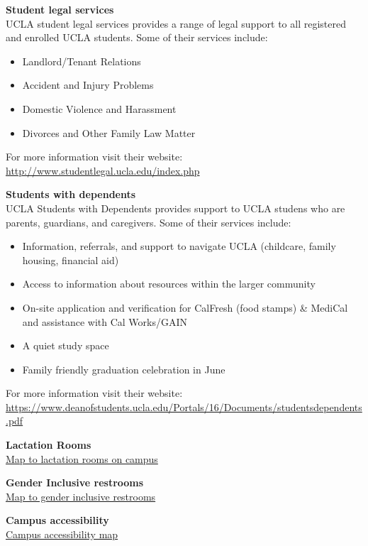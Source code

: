 \documentclass[11pt,]{article}
\providecommand{\tightlist}{%
  \setlength{\itemsep}{0pt}\setlength{\parskip}{0pt}}
\begin{document}
\textbf{Student legal services}\\
UCLA student legal services provides a range of legal support to all
registered and enrolled UCLA students. Some of their services include:

\begin{itemize}
\tightlist
\item
  Landlord/Tenant Relations\\
\item
  Accident and Injury Problems\\
\item
  Domestic Violence and Harassment\\
\item
  Divorces and Other Family Law Matter
\end{itemize}

For more information visit their website:
\url{http://www.studentlegal.ucla.edu/index.php}

\textbf{Students with dependents}\\
UCLA Students with Dependents provides support to UCLA studens who are
parents, guardians, and caregivers. Some of their services include:

\begin{itemize}
\tightlist
\item
  Information, referrals, and support to navigate UCLA (childcare,
  family housing, financial aid)\\
\item
  Access to information about resources within the larger community\\
\item
  On-site application and verification for CalFresh (food stamps) \&
  MediCal and assistance with Cal Works/GAIN\\
\item
  A quiet study space\\
\item
  Family friendly graduation celebration in June
\end{itemize}

For more information visit their website:
\url{https://www.deanofstudents.ucla.edu/Portals/16/Documents/studentsdependents.pdf}

\textbf{Lactation Rooms}\\
\href{https://map.ucla.edu/?f=5}{Map to lactation rooms on campus}

\textbf{Gender Inclusive restrooms}\\
\href{http://maps.ucla.edu/campus/?a_layers=flyr_restrooms}{Map to
gender inclusive restrooms}

\textbf{Campus accessibility}\\
\href{https://maps.ucla.edu/downloads/pdf/Access_08_21_15.pdf}{Campus
accessibility map}
\end{document}
